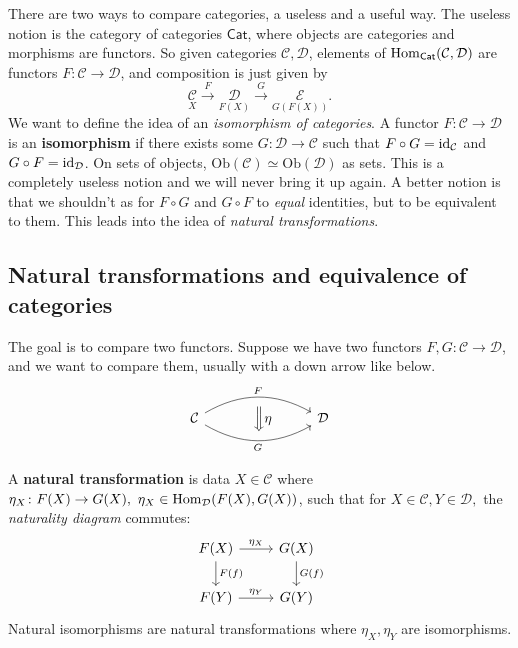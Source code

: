 There are two ways to compare categories, a useless and a useful way. The useless notion is the category of categories $\mathsf{Cat} $, where objects are categories and morphisms are functors. So given categories $\mathcal{C} ,\mathcal{D} $, elements of $\operatorname{Hom} _{\mathsf{Cat} }(\mathcal{C} ,\mathcal{D} )$ are functors $F \colon \mathcal{C}  \to \mathcal{D} $, and composition is just given by \[
    \underset{X}{\mathcal{C}}  \overset{F}{\longrightarrow}  \underset{F(X)}{\mathcal{D}}  \overset{G}{\longrightarrow} \underset{G(F(X))}{\mathcal{E} } .
\] We want to define the idea of an \emph{isomorphism of categories}. A functor $F \colon \mathcal{C}  \to \mathcal{D} $ is an \textbf{isomorphism} if there exists some $G \colon \mathcal{D}  \to \mathcal{C} $ such that $F \circ G=\operatorname{id}_{\mathcal{C} }$ and $G \circ F=\operatorname{id} _{\mathcal{D} }$. On sets of objects, $\mathrm{Ob}(\mathcal{C} )\simeq \mathrm{Ob}(\mathcal{D} )$ as sets. This is a completely useless notion and we will never bring it up again. A better notion is that we shouldn't as for $F \circ G$ and $G \circ F$ to \emph{equal} identities, but to be equivalent to them. This leads into the idea of \emph{natural transformations}.

\subsection{Natural transformations and equivalence of categories}
The goal is to compare two functors. Suppose we have two functors $F,G \colon \mathcal{C}  \to \mathcal{D} $, and we want to compare them, usually with a down arrow like below.
\[
    \begin{tikzcd}
        \mathcal{C} \arrow[rr, "F", bend left] \arrow[rr, "G"', bend right] & \,\,~ \Big\Downarrow\eta & \mathcal{D}
\end{tikzcd}
\] 
\begin{definition}[]
    A \textbf{natural transformation} is data $X \in \mathcal{C} $ where $\eta_X \colon F(X) \to G(X), \ \eta_X \in \operatorname{Hom}_{\mathcal{D} }(F(X),G(X))$, such that for $X \in \mathcal{C} ,Y \in \mathcal{D},$ the \emph{naturality diagram} commutes: 
    \[
    \begin{tikzcd}
        F(X) \arrow[r,"\eta_X"]\arrow[d,"F(f)"]& G(X)\arrow[d,"G(f)"]\\
        F(Y)\arrow[r,"\eta_Y"]& G(Y)
    \end{tikzcd}
    \] Natural isomorphisms are natural transformations where $\eta_X,\eta_Y$ are isomorphisms.
\end{definition}

